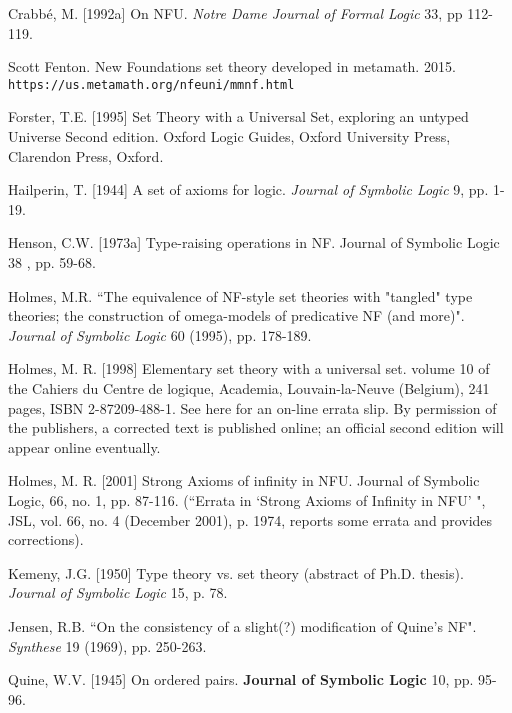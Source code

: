 \documentclass[112pt]{article}
\begin{document}
\newpage

\begin{thebibliography}{99}


  Crabb\'{e}, M. [1992a]
On NFU.
{\em Notre Dame Journal of Formal Logic\/} 33, pp 112-119. 

  Scott Fenton.  New Foundations set theory developed in metamath.  2015.  {\tt https://us.metamath.org/nfeuni/mmnf.html}

  Forster, T.E. [1995] 
Set Theory with a Universal Set, exploring an untyped Universe 
Second edition. Oxford Logic Guides, Oxford University Press, Clarendon Press, Oxford.

 Hailperin, T. [1944]
A set of axioms for logic.
{\em Journal of Symbolic Logic\/} 9, pp. 1-19.

 

   Henson, C.W. [1973a] 
Type-raising operations in NF. 
Journal of Symbolic Logic 38 , pp. 59-68.

  Holmes, M.R.
``The equivalence of NF-style set theories with "tangled" type theories; the construction of omega-models of predicative NF (and more)". 
{\em Journal of Symbolic Logic\/} 60 (1995), pp. 178-189.

  Holmes, M. R. [1998] 
Elementary set theory with a universal set. 
volume 10 of the Cahiers du Centre de logique, Academia, Louvain-la-Neuve (Belgium), 241 pages, ISBN 2-87209-488-1. See here for an on-line errata slip. By permission of the publishers, a corrected text is published online; an official second edition will appear online eventually.

   Holmes, M. R. [2001]
Strong Axioms of infinity in NFU.
Journal of Symbolic Logic, 66, no. 1, pp. 87-116.  \newline(``Errata in `Strong
Axioms of Infinity in NFU' ", JSL, vol. 66, no. 4 (December
2001), p. 1974, reports some errata and provides corrections).

  Kemeny, J.G. [1950]
Type theory vs. set theory (abstract of Ph.D. thesis).
{\em Journal of Symbolic Logic\/} 15, p. 78. 

  Jensen, R.B.
``On the consistency of a slight(?) modification of Quine's NF". 
{\em Synthese\/} 19 (1969), pp. 250-263.

  Quine, W.V. [1945]
On ordered pairs.
{\bf Journal of Symbolic Logic\/} 10, pp. 95-96. 


\end{thebibliography}
\end{document}
